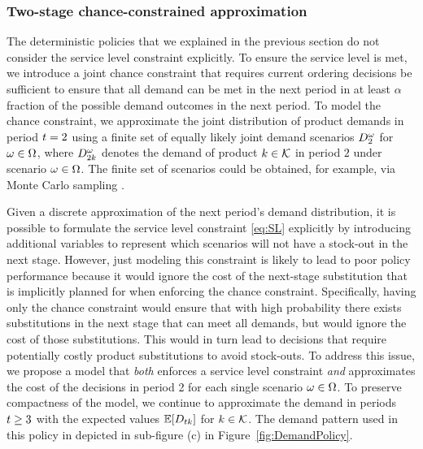 \documentclass[msom]{oo}
\begin{document}
\subsubsection{Two-stage chance-constrained approximation}
\label{ss:cc}

The deterministic policies that we explained in the previous section do not consider the service level constraint explicitly. To ensure the service level is met, we introduce a joint chance constraint that requires current ordering decisions be sufficient to ensure that all demand can be met in the next period in at least $\alpha$ fraction of the possible demand outcomes in the next period. To model the chance constraint, we approximate the joint distribution of product demands in period $t=2$ using a finite set of equally likely joint demand scenarios $D^{\omega}_{2}$ for $\omega \in \Omega$, where $D^{\omega}_{2k}$ denotes the demand of product $k \in \mathcal{K}$ in period $2$ under scenario $\omega \in \Omega$. The finite set of scenarios could be obtained, for example, via Monte Carlo sampling \citep{luedtke2008sample}. 

Given a discrete approximation of the next period's demand distribution, it is possible to formulate the service level constraint \eqref{eq:SL} explicitly by introducing additional variables to represent which scenarios will not have a stock-out in the next stage.
However, just modeling this constraint is likely to lead to poor policy performance because it would ignore the cost of the next-stage substitution that is implicitly planned for when enforcing the chance constraint.  Specifically, having only the chance constraint would ensure that with high probability there exists substitutions in the next stage that
can meet all demands, but would ignore the cost of those substitutions. %
This would in turn lead to decisions that require potentially costly product substitutions to avoid stock-outs. To address this issue, we propose a model that {\it both} enforces a service level constraint {\it and} approximates the cost of the decisions in period 2 for each single scenario $\omega \in \Omega$. To preserve compactness of the model, we continue to approximate the demand in periods $t \geq 3$ with the expected values $\mathbb{E}[D_{tk}]$ for $k \in \mathcal{K}$. The demand pattern used in this policy in depicted in sub-figure (c) in Figure~\ref{fig:DemandPolicy}.
\end{document}
